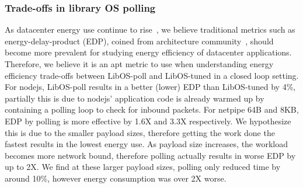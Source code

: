\subsubsection{Trade-offs in library OS polling}
As datacenter energy use continue to rise~\cite{gupta2020chasing, NLP-energy,warehouse-power}, we believe traditional metrics such as energy-delay-product (EDP), coined from architecture community~\cite{573184,10.1109/40.888701}, should become more prevalent for studying energy efficiency of datacenter applications. Therefore, we believe it is an apt metric to use when understanding energy efficiency trade-offs between LibOS-poll and LibOS-tuned in a closed loop setting. For nodejs, LibOS-poll results in a better (lower) EDP than LibOS-tuned by 4\%, partially this is due to nodejs' application code is already warmed up by containing a polling loop to check for inbound packets. For netpipe 64B and 8KB, EDP by polling is more effective by 1.6X and 3.3X respectively. We hypothesize this is due to the smaller payload sizes, therefore getting the work done the fastest results in the lowest energy use. As payload size increases, the workload becomes more network bound, therefore polling actually results in worse EDP by up to 2X. We find at these larger payload sizes, polling only reduced time by around 10\%, however energy consumption was over 2X worse.

